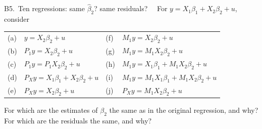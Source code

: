 \begin{qbox}{B5.\ Ten regressions: same $\hat\beta_{2}$? same residuals?}{\must\ \ }
For $y = X_{1}\beta_{1} + X_{2}\beta_{2} + u$, consider
\begin{center}
\renewcommand{\arraystretch}{1.1}
\begin{tabular}{ll@{\qquad}ll}
(a) & $y = X_{2}\beta_{2} + u$ & (f) & $M_{1}y = X_{2}\beta_{2} + u$ \\
(b) & $P_{1}y = X_{2}\beta_{2} + u$ & (g) & $M_{1}y = M_{1}X_{2}\beta_{2} + u$ \\
(c) & $P_{1}y = P_{1}X_{2}\beta_{2} + u$ & (h) & $M_{1}y = X_{1}\beta_{1} + M_{1}X_{2}\beta_{2} + u$ \\
(d) & $P_{X}y = X_{1}\beta_{1} + X_{2}\beta_{2} + u$ & (i) & $M_{1}y = M_{1}X_{1}\beta_{1} + M_{1}X_{2}\beta_{2} + u$ \\
(e) & $P_{X}y = X_{2}\beta_{2} + u$ & (j) & $P_{X}y = M_{1}X_{2}\beta_{2} + u$
\end{tabular}
\end{center}
For which are the estimates of $\beta_{2}$ the same as in the original regression, and why? For which are the
residuals the same, and why?
\end{qbox}
